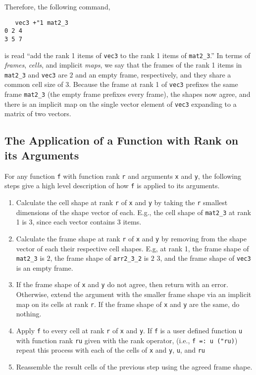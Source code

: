 Therefore, the following command, 

\begin{singlespacing}
\begin{small}
\begin{verbatim}
   vec3 +"1 mat2_3
0 2 4
3 5 7
\end{verbatim}
\end{small}
\end{singlespacing}

\noindent is read ``add the rank 1 items of \texttt{vec3} to the rank 1 items of \texttt{mat2\_3}.''
In terms of \textit{frames}, \textit{cells}, and implicit \textit{maps}, we say that
the frames of the rank 1 items in \texttt{mat2\_3} and \texttt{vec3} are $2$ and an empty frame, respectively, and they share a common cell size of $3$.
Because the frame at rank 1 of \texttt{vec3} prefixes the same frame \texttt{mat2\_3} (the empty frame prefixes every frame), 
the shapes now agree, and there is an implicit map on the single vector element of \texttt{vec3} expanding to a matrix of two vectors.

\subsection{The Application of a Function with Rank on its Arguments}
\label{fridp}
For any function \texttt{f} with function rank \texttt{r} and arguments \texttt{x} and \texttt{y}, 
the following steps give a high level description of how \texttt{f} is applied to its arguments\cite{rankanduni}.
\begin{enumerate}
	\item Calculate the cell shape at rank \texttt{r} of \texttt{x} and \texttt{y} 
		by taking the \texttt{r} smallest dimensions of the shape vector of each.
		E.g., the cell shape of \texttt{mat2\_3} at rank 1 is 3, since each vector contains 3 items.
	\item Calculate the frame shape at rank \texttt{r} of \texttt{x} and \texttt{y} 
		by removing from the shape vector of each their respective cell shapes.
		E.g, at rank 1, the frame shape of \texttt{mat2\_3} is $2$,
		the frame shape of \texttt{arr2\_3\_2} is $2$ $3$, 
		and the frame shape of \texttt{vec3} is an empty frame.
	\item If the frame shape of \texttt{x} and \texttt{y} do not agree, then return with an error.
		Otherwise, extend the argument with the smaller frame shape via an implicit map on its cells at rank \texttt{r}.
		If the frame shape of \texttt{x} and \texttt{y} are the same, do nothing.
	\item \label{dataparstep}Apply \texttt{f} to every cell at rank \texttt{r} of \texttt{x} and \texttt{y}.
		If \texttt{f} is a user defined function \texttt{u} with function rank \texttt{ru} given with the rank operator,
		(i.e., \texttt{f =: u ("ru)})
		repeat this process with each of the cells of \texttt{x} and \texttt{y}, \texttt{u}, and \texttt{ru}
	\item Reassemble the result cells of the previous step using the agreed frame shape.
\end{enumerate}

